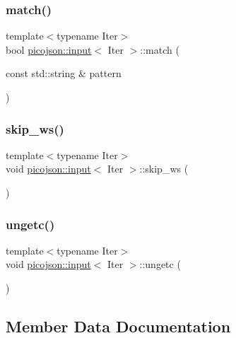 \subsubsection{\texorpdfstring{match()}{match()}}
{\footnotesize\ttfamily template$<$typename Iter$>$ \\
bool \hyperlink{classpicojson_1_1input}{picojson\+::input}$<$ Iter $>$\+::match (\begin{DoxyParamCaption}\item[{const std\+::string \&}]{pattern }\end{DoxyParamCaption})\hspace{0.3cm}{\ttfamily [inline]}}

\hypertarget{classpicojson_1_1input_aa83aefe87374a5e24ab8c8e80fef4aa4}{}\label{classpicojson_1_1input_aa83aefe87374a5e24ab8c8e80fef4aa4} 
\subsubsection{\texorpdfstring{skip\+\_\+ws()}{skip\_ws()}}
{\footnotesize\ttfamily template$<$typename Iter$>$ \\
void \hyperlink{classpicojson_1_1input}{picojson\+::input}$<$ Iter $>$\+::skip\+\_\+ws (\begin{DoxyParamCaption}{ }\end{DoxyParamCaption})\hspace{0.3cm}{\ttfamily [inline]}}

\hypertarget{classpicojson_1_1input_a96ccc244e73b2ab87ded38c98e98d573}{}\label{classpicojson_1_1input_a96ccc244e73b2ab87ded38c98e98d573} 
\subsubsection{\texorpdfstring{ungetc()}{ungetc()}}
{\footnotesize\ttfamily template$<$typename Iter$>$ \\
void \hyperlink{classpicojson_1_1input}{picojson\+::input}$<$ Iter $>$\+::ungetc (\begin{DoxyParamCaption}{ }\end{DoxyParamCaption})\hspace{0.3cm}{\ttfamily [inline]}}



\subsection{Member Data Documentation}
\hypertarget{classpicojson_1_1input_af07464e7d4f25b902d65d8f8ee79b8a6}{}\label{classpicojson_1_1input_af07464e7d4f25b902d65d8f8ee79b8a6} 
